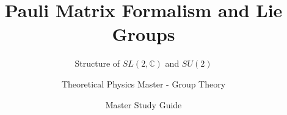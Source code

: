 
\usepackage{amsmath, amssymb, amsfonts, physics, hyperref}

\newtheorem{proposition}{Proposition}

\title{Pauli Matrix Formalism and Lie Groups}
\subtitle{Structure of $SL(2,\mathbb{C})$ and $SU(2)$}
\author{Theoretical Physics Master - Group Theory}
\date{Master Study Guide}
